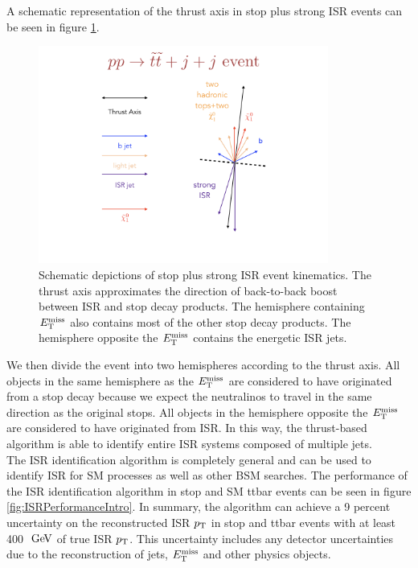 \indent A schematic representation of the thrust axis in stop plus strong ISR events can be seen in figure \ref{fig:ISR:ttbar_sig_example}. \\

\begin{figure}[h!]
  \centering
	\includegraphics[width=0.85\textwidth]{./figures/strategy/ISR_signal.png}
	\caption[Schematic depictions of stop plus strong initial state radiation event kinematics]{Schematic depictions of stop plus strong ISR event kinematics.  The thrust axis approximates the direction of back-to-back boost between ISR and stop decay products.  The hemisphere containing $E_{\mathrm{T}}^{\mathrm{miss}}$ also contains most of the other stop decay products.  The hemisphere opposite the $E_{\mathrm{T}}^{\mathrm{miss}}$ contains the energetic ISR jets. }
	\label{fig:ISR:ttbar_sig_example}
\end{figure}

\indent We then divide the event into two hemispheres according to the thrust axis.  All objects in the same hemisphere as the $E_{\mathrm{T}}^{\mathrm{miss}}$ are considered to have originated from a stop decay because we expect the neutralinos to travel in the same direction as the original stops.  All objects in the hemisphere opposite the $E_{\mathrm{T}}^{\mathrm{miss}}$ are considered to have originated from ISR.  In this way, the thrust-based algorithm is able to identify entire ISR systems composed of multiple jets.  \\ 

\indent The ISR identification algorithm is completely general and can be used to identify ISR for SM processes as well as other BSM searches.  The performance of the ISR identification algorithm in stop and SM ttbar events can be seen in figure \ref{fig:ISRPerformanceIntro}.  In summary, the algorithm can achieve a 9 percent uncertainty on the reconstructed ISR $p_{\mathrm{T}}$ in stop and ttbar events with at least 400 $\gev$ of true ISR $p_{\mathrm{T}}$. This uncertainty includes any detector uncertainties due to the reconstruction of jets, $E_{\mathrm{T}}^{\mathrm{miss}}$ and other physics objects.  \\

